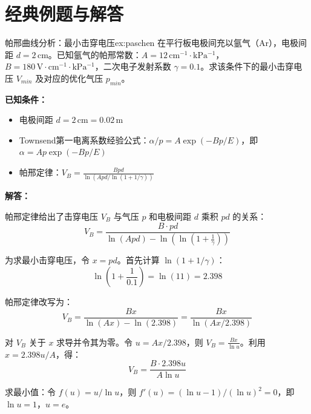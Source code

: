 ﻿%


\section{经典例题与解答}

\begin{example}{帕邢曲线分析：最小击穿电压}{ex:paschen}
在平行板电极间充以氩气（Ar），电极间距 $d=2\,\mathrm{cm}$。已知氩气的帕邢常数：$A=12\,\mathrm{cm^{-1}\cdot kPa^{-1}}$，$B=180\,\mathrm{V\cdot cm^{-1}\cdot kPa^{-1}}$，二次电子发射系数 $\gamma=0.1$。求该条件下的最小击穿电压 $V_{min}$ 及对应的优化气压 $p_{min}$。
\end{example}

\textbf{已知条件：}
\begin{itemize}
    \item 电极间距 $d = 2\,\mathrm{cm} = 0.02\,\mathrm{m}$
    \item Townsend第一电离系数经验公式：$\alpha/p = A\exp(-Bp/E)$，即 $\alpha = A p \exp(-Bp/E)$
    \item 帕邢定律：$V_B = \frac{B p d}{\ln(A p d / \ln(1+1/\gamma))}$
\end{itemize}

\textbf{解答：}

帕邢定律给出了击穿电压 $V_B$ 与气压 $p$ 和电极间距 $d$ 乘积 $pd$ 的关系：
\begin{equation}
    V_B = \frac{B \cdot p d}{\ln(A p d) - \ln\left(\ln\left(1+\frac{1}{\gamma}\right)\right)}
\label{eq:ch11-paschen-law}
\end{equation}

为求最小击穿电压，令 $x = pd$。首先计算 $\ln(1+1/\gamma)$：
\[
    \ln\left(1+\frac{1}{0.1}\right) = \ln(11) = 2.398
\]

帕邢定律改写为：
\[
    V_B = \frac{B x}{\ln(A x) - \ln(2.398)} = \frac{B x}{\ln(A x / 2.398)}
\]

对 $V_B$ 关于 $x$ 求导并令其为零。令 $u = A x / 2.398$，则 $V_B = \frac{B x}{\ln u}$。利用 $x = 2.398 u / A$，得：
\[
    V_B = \frac{B \cdot 2.398 u}{A \ln u}
\]

求最小值：令 $f(u) = u / \ln u$，则 $f'(u) = (\ln u - 1) / (\ln u)^2 = 0$，即 $\ln u = 1$，$u = e$。

